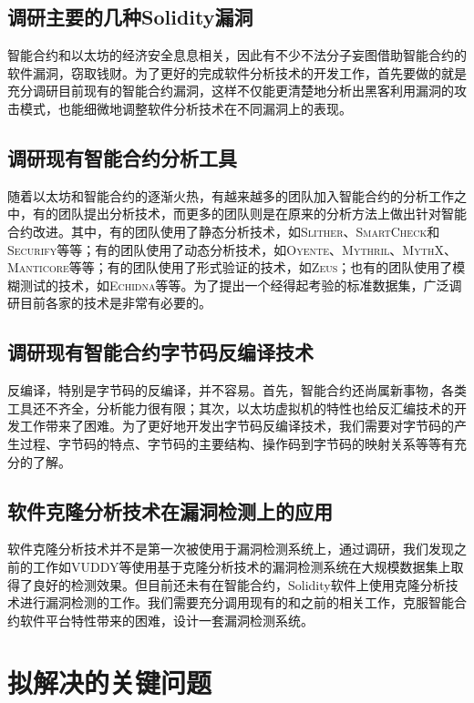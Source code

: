 \subsection{调研主要的几种Solidity漏洞}

智能合约和以太坊的经济安全息息相关，因此有不少不法分子妄图借助智能合约的软件漏洞，窃取钱财。为了更好的完成软件分析技术的开发工作，首先要做的就是充分调研目前现有的智能合约漏洞，这样不仅能更清楚地分析出黑客利用漏洞的攻击模式，也能细微地调整软件分析技术在不同漏洞上的表现。

\subsection{调研现有智能合约分析工具}

随着以太坊和智能合约的逐渐火热，有越来越多的团队加入智能合约的分析工作之中，有的团队提出分析技术，而更多的团队则是在原来的分析方法上做出针对智能合约改进。其中，有的团队使用了静态分析技术，如\textsc{Slither}、\textsc{SmartCheck}和\textsc{Securify}等等；有的团队使用了动态分析技术，如\textsc{Oyente}、\textsc{Mythril}、\textsc{MythX}、\textsc{Manticore}等等；有的团队使用了形式验证的技术，如\textsc{Zeus}；也有的团队使用了模糊测试的技术，如\textsc{Echidna}等等。为了提出一个经得起考验的标准数据集，广泛调研目前各家的技术是非常有必要的。

\subsection{调研现有智能合约字节码反编译技术}

反编译，特别是字节码的反编译，并不容易。首先，智能合约还尚属新事物，各类工具还不齐全，分析能力很有限；其次，以太坊虚拟机的特性也给反汇编技术的开发工作带来了困难。为了更好地开发出字节码反编译技术，我们需要对字节码的产生过程、字节码的特点、字节码的主要结构、操作码到字节码的映射关系等等有充分的了解。

\subsection{软件克隆分析技术在漏洞检测上的应用}

软件克隆分析技术并不是第一次被使用于漏洞检测系统上，通过调研，我们发现之前的工作如VUDDY\cite{vuddy}等使用基于克隆分析技术的漏洞检测系统在大规模数据集上取得了良好的检测效果。但目前还未有在智能合约，Solidity软件上使用克隆分析技术进行漏洞检测的工作。我们需要充分调用现有的和之前的相关工作，克服智能合约软件平台特性带来的困难，设计一套漏洞检测系统。

\section{拟解决的关键问题}

